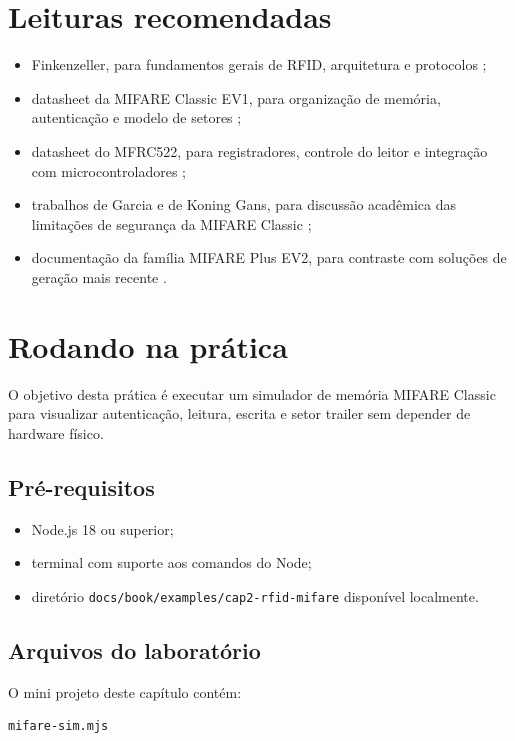 \section{Leituras recomendadas}
\begin{itemize}[leftmargin=*]
  \item Finkenzeller, para fundamentos gerais de RFID, arquitetura e protocolos \citep{finkenzeller_rfid};
  \item datasheet da MIFARE Classic EV1, para organização de memória, autenticação e modelo de setores \citep{nxp_mifare_classic_ev1};
  \item datasheet do MFRC522, para registradores, controle do leitor e integração com microcontroladores \citep{nxp_mfrc522};
  \item trabalhos de Garcia e de Koning Gans, para discussão acadêmica das limitações de segurança da MIFARE Classic \citep{garcia_dismantling_mifare,gans_practical_attack_mifare};
  \item documentação da família MIFARE Plus EV2, para contraste com soluções de geração mais recente \citep{nxp_mifare_plus_ev2}.
\end{itemize}

\section{Rodando na prática}
O objetivo desta prática é executar um simulador de memória MIFARE Classic para visualizar autenticação, leitura, escrita e setor trailer sem depender de hardware físico.

\subsection{Pré-requisitos}
\begin{itemize}[leftmargin=*]
  \item Node.js 18 ou superior;
  \item terminal com suporte aos comandos do Node;
  \item diretório \texttt{docs/book/examples/cap2-rfid-mifare} disponível localmente.
\end{itemize}

\subsection{Arquivos do laboratório}
O mini projeto deste capítulo contém:
\begin{verbatim}
mifare-sim.mjs
\end{verbatim}

